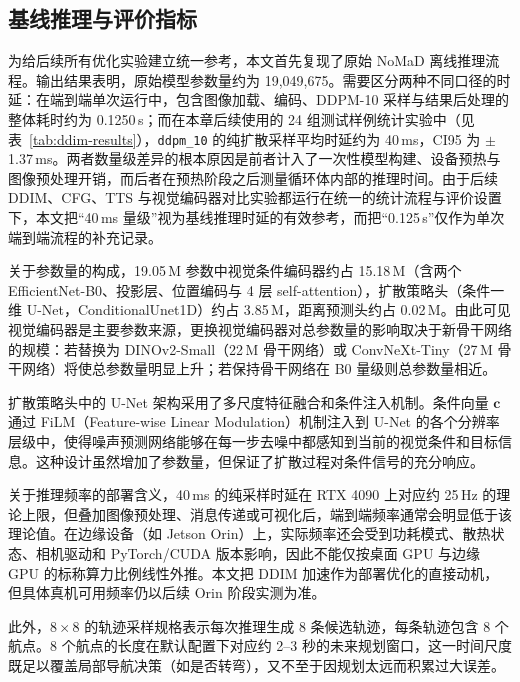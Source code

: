 \subsection{基线推理与评价指标}

为给后续所有优化实验建立统一参考，本文首先复现了原始 NoMaD 离线推理流程。输出结果表明，原始模型参数量约为 19,049,675。需要区分两种不同口径的时延：在端到端单次运行中，包含图像加载、编码、DDPM-10 采样与结果后处理的整体耗时约为 0.1250\,s；而在本章后续使用的 24 组测试样例统计实验中（见表~\ref{tab:ddim-results}），\texttt{ddpm\_10} 的纯扩散采样平均时延约为 40\,ms，CI95 为 $\pm$1.37\,ms。两者数量级差异的根本原因是前者计入了一次性模型构建、设备预热与图像预处理开销，而后者在预热阶段之后测量循环体内部的推理时间。由于后续 DDIM、CFG、TTS 与视觉编码器对比实验都运行在统一的统计流程与评价设置下，本文把``40\,ms 量级''视为基线推理时延的有效参考，而把``0.125\,s''仅作为单次端到端流程的补充记录。

关于参数量的构成，19.05\,M 参数中视觉条件编码器约占 15.18\,M（含两个 EfficientNet-B0、投影层、位置编码与 4 层 self-attention），扩散策略头（条件一维 U-Net，ConditionalUnet1D）约占 3.85\,M，距离预测头约占 0.02\,M。由此可见视觉编码器是主要参数来源，更换视觉编码器对总参数量的影响取决于新骨干网络的规模：若替换为 DINOv2-Small（22\,M 骨干网络）或 ConvNeXt-Tiny（27\,M 骨干网络）将使总参数量明显上升；若保持骨干网络在 B0 量级则总参数量相近。

扩散策略头中的 U-Net 架构采用了多尺度特征融合和条件注入机制。条件向量 $\mathbf{c}$ 通过 FiLM（Feature-wise Linear Modulation）机制注入到 U-Net 的各个分辨率层级中，使得噪声预测网络能够在每一步去噪中都感知到当前的视觉条件和目标信息。这种设计虽然增加了参数量，但保证了扩散过程对条件信号的充分响应。

关于推理频率的部署含义，40\,ms 的纯采样时延在 RTX 4090 上对应约 25\,Hz 的理论上限，但叠加图像预处理、消息传递或可视化后，端到端频率通常会明显低于该理论值。在边缘设备（如 Jetson Orin）上，实际频率还会受到功耗模式、散热状态、相机驱动和 PyTorch/CUDA 版本影响，因此不能仅按桌面 GPU 与边缘 GPU 的标称算力比例线性外推。本文把 DDIM 加速作为部署优化的直接动机，但具体真机可用频率仍以后续 Orin 阶段实测为准。

此外，$8 \times 8$ 的轨迹采样规格表示每次推理生成 8 条候选轨迹，每条轨迹包含 8 个航点。8 个航点的长度在默认配置下对应约 2--3 秒的未来规划窗口，这一时间尺度既足以覆盖局部导航决策（如是否转弯），又不至于因规划太远而积累过大误差。

